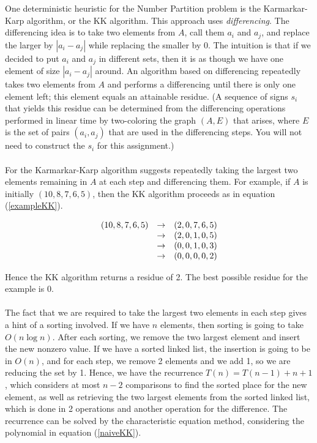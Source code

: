 \documentclass[tikz, 12pt]{scrartcl}
\begin{document}
One deterministic heuristic for the Number Partition problem is the Karmarkar-Karp algorithm, or the KK algorithm. This approach uses \textit{differencing}. The differencing idea is to take two elements from $A$, call them $a_i$ and $a_j$, and replace the larger by $|a_i - a_j|$ while replacing the smaller by 0. The intuition is that if we decided to put $a_i$ and $a_j$ in different sets, then it is as though we have one element of size $|a_i - a_j|$ around. An algorithm based on differencing repeatedly takes two elements from $A$ and performs a differencing until there is only one element left; this element equals an attainable residue. (A sequence of signs $s_i$ that yields this residue can be determined from the differencing operations performed in linear time by two-coloring the graph $(A, E)$ that arises, where $E$ is the set of pairs $(a_i, a_j)$ that are used in the differencing steps. You will not need to construct the $s_i$ for this assignment.)\\
\\
For the Karmarkar-Karp algorithm suggests repeatedly taking the largest two elements remaining in $A$ at each step and differencing them. For example, if $A$ is initially $(10, 8, 7, 6, 5)$, then the KK algorithm proceeds as in equation (\ref{exampleKK}).

\begin{equation}\label{exampleKK}
\centering
\begin{array}{ccc}
(10, 8, 7, 6, 5)	&	\rightarrow &	(2, 0, 7, 6, 5) \\
				&	\rightarrow	&	(2, 0, 1, 0, 5) \\
				&	\rightarrow &	(0, 0, 1, 0, 3) \\
				&	\rightarrow &	(0, 0, 0, 0, 2)
\end{array}
\end{equation}

Hence the KK algorithm returns a residue of 2. The best possible residue for the example is 0.\\
\\
The fact that we are required to take the largest two elements in each step gives a hint of a sorting involved. If we have $n$ elements, then sorting is going to take $O(n \log n)$. After each sorting, we remove the two largest element and insert the new nonzero value. If we have a sorted linked list, the insertion is going to be in $O(n)$, and for each step, we remove 2 elements and we add 1, so we are reducing the set by 1. Hence, we have the recurrence $T(n) = T(n - 1) + n + 1$ , which considers at most $n - 2$ comparisons to find the sorted place for the new element, as well as retrieving the two largest elements from the sorted linked list, which is done in 2 operations and another operation for the difference. The recurrence 
can be solved by the characteristic equation method, considering the polynomial in equation (\ref{naiveKK}).
\end{document}

